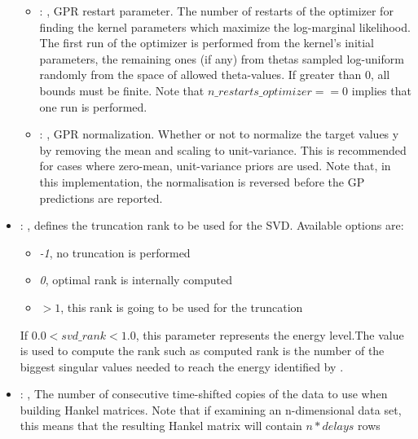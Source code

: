 \begin{itemize}
\begin{itemize}
        \item {}: ,
          GPR restart parameter. The number of restarts of the optimizer for finding the
          kernel parameters which maximize the log-marginal likelihood. The first run of the
          optimizer                                                  is performed from the kernel’s
          initial parameters, the remaining ones (if any) from thetas
          sampled log-uniform randomly from the space of allowed theta-values. If greater than 0,
          all bounds must be finite. Note that $n\_restarts\_optimizer == 0$ implies that one run is
          performed.

        \item {}: ,
          GPR normalization. Whether or not to normalize the target values y by removing the mean
          and scaling                                                  to unit-variance. This is
          recommended for cases where zero-mean, unit-variance priors are used.
          Note that, in this implementation, the normalisation is reversed before the GP predictions
          are reported.
      \end{itemize}

    \item {}: ,
      defines the truncation rank to be used for the SVD.
      Available options are:                                                  \begin{itemize}
      \item \textit{-1}, no truncation is performed
      \item \textit{0}, optimal rank is internally computed
      \item \textit{$>1$}, this rank is going to be used for the truncation
      \end{itemize}                                                  If $0.0 < svd\_rank < 1.0$, this
      parameter represents the energy level.The value is used to compute the rank such
      as computed rank is the number of the biggest singular values needed to reach the energy
      identified by                                                    .

    \item {}: ,
      The number of consecutive time-shifted copies of the data to use when building Hankel
      matrices.                                                  Note that if examining an
      n-dimensional data set, this means that the resulting Hankel matrix
      will contain $n * delays$ rows


\end{itemize}
